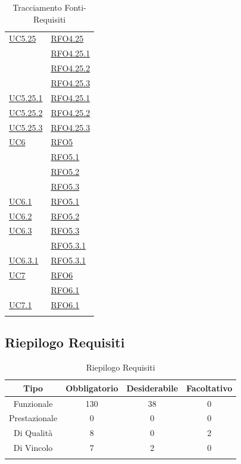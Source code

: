 \begin{longtable}{|>{\centering}m{5cm}|m{5cm}<{\centering}|}
\hyperref[UC5.25]{UC5.25} & \hyperlink{RFO4.25}{RFO4.25}\\ 
& \hyperlink{RFO4.25.1}{RFO4.25.1}\\ 
& \hyperlink{RFO4.25.2}{RFO4.25.2}\\ 
& \hyperlink{RFO4.25.3}{RFO4.25.3}\\ \hline 
\hyperref[UC5.25.1]{UC5.25.1} & \hyperlink{RFO4.25.1}{RFO4.25.1}\\\hline
\hyperref[UC5.25.2]{UC5.25.2} & \hyperlink{RFO4.25.2}{RFO4.25.2}\\\hline
\hyperref[UC5.25.3]{UC5.25.3} & \hyperlink{RFO4.25.3}{RFO4.25.3}\\\hline

\hyperref[UC6]{UC6} & \hyperlink{RFO5}{RFO5}\\ 
 & \hyperlink{RFO5.1}{RFO5.1}\\ 
 & \hyperlink{RFO5.2}{RFO5.2}\\ 
 & \hyperlink{RFO5.3}{RFO5.3}\\ \hline
 \hyperref[UC6.1]{UC6.1} & \hyperlink{RFO5.1}{RFO5.1}\\ \hline
 \hyperref[UC6.2]{UC6.2} & \hyperlink{RFO5.2}{RFO5.2}\\ \hline
 \hyperref[UC6.3]{UC6.3} & \hyperlink{RFO5.3}{RFO5.3}\\ 
 & \hyperlink{RFO5.3.1}{RFO5.3.1}\\ \hline
  \hyperref[UC6.3.1]{UC6.3.1} & \hyperlink{RFO5.3.1}{RFO5.3.1}\\ \hline
\hyperref[UC7]{UC7} & \hyperlink{RFO6}{RFO6}\\ 
& \hyperlink{RFO6.1}{RFO6.1}\\ \hline
\hyperref[UC7.1]{UC7.1} & \hyperlink{RFO6.1}{RFO6.1}\\ \hline

\caption[Tracciamento Fonti-Requisiti]{Tracciamento Fonti-Requisiti}
\label{tabella:fonti-requi}
\end{longtable}
\clearpage

\subsection{Riepilogo Requisiti}
\normalsize
\begin{longtable}{|c|c|c|c|}
\hline 
\textbf{Tipo} & \textbf{Obbligatorio} & \textbf{Desiderabile} & \textbf{Facoltativo}\\
\hline
Funzionale & 130 & 38 & 0\\ \hline
Prestazionale & 0 & 0 & 0\\ \hline
Di Qualità & 8 & 0 & 2\\ \hline
Di Vincolo & 7 & 2 & 0\\ \hline
\caption[Riepilogo Requisiti]{Riepilogo Requisiti}
\label{tabella:riepilogorequi}
\end{longtable}
\clearpage
\clearpage
\appendix
